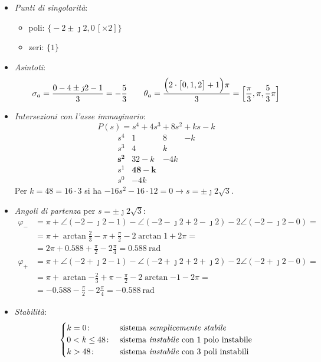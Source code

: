 \begin{esercizio}
\begin{itemize}
	\item \emph{Punti di singolarità}:
		\begin{itemize}
			\item poli: \(\bigl\{ -2\pm\jmath2, 0\,[\times 2] \bigr\}\)
			\item zeri: \(\bigl\{ 1 \bigr\}\)
		\end{itemize}
	\item \emph{Asintoti}:
		\[
			\sigma_a = \frac{0-4\pm\jmath2-1}{3} = -\frac{5}{3} \qquad
			\theta_a = \frac{\Bigl(2\cdot \bigl[ 0,1,2 \bigr] +1 \Bigr)\pi}{3} = \Bigl[ \frac{\pi}{3},\pi,\frac{5}{3}\pi \Bigr]
		\]
	\item \emph{Intersezioni con l'asse immaginario}:
		\[
			P(s) = s^4 +4s^3 +8s^2 +ks -k
		\]
		\[\begin{array}{r|rrr}
			s^4 	 & 1    &   8 & -k \\
			s^3 	 & 4    &   k 	   \\
			\bm{s^2} & 32-k & -4k 	   \\
			s^1 	 & \bm{48-k} 	   \\
			s^0 	 & -4k
		\end{array}\]
		Per \(k = 48 = 16\cdot3\) si ha \(-16s^2-16\cdot12=0 \rightarrow
		s = \pm\jmath2\sqrt{3}\).
	\item \emph{Angoli di partenza} per \(s = \pm\jmath2\sqrt{3}\):
		\begin{align*}
			\varphi_- &= \pi + \angle(-2-\jmath2-1) -\angle(-2-\jmath2+2-\jmath2) -2\angle(-2-\jmath2-0) = \\
				  &= \pi + \arctan{\frac{2}{3}} -\pi +\frac{\pi}{2} -2\arctan{1} +2\pi = \\
				  &= 2\pi +0.588 +\frac{\pi}{2} -2\frac{\pi}{4} = \SI{0.588}{\radian} \\
			\varphi_+ &= \pi +\angle(-2+\jmath2-1) -\angle(-2+\jmath2+2+\jmath2) -2\angle(-2+\jmath2-0) = \\
				  &= \pi +\arctan{-\frac{2}{3}} +\pi -\frac{\pi}{2} -2\arctan{-1} -2\pi = \\
				  &= -0.588 -\frac{\pi}{2} -2\frac{\pi}{4} = \SI{-0.588}{\radian}
		\end{align*}
	\item \emph{Stabilità}:
		\[\begin{cases}
			k = 0\colon & \text{sistema \emph{semplicemente stabile}} \\
			0 < k \leq 48\colon & \text{sistema \emph{instabile} con 1 polo instabile} \\
			k > 48\colon & \text{sistema \emph{instabile} con 3 poli instabili}
		\end{cases}\]
\end{itemize}


\end{esercizio}
